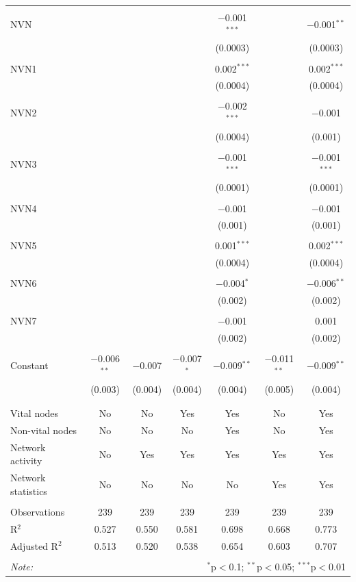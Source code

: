 \begin{table}[!htbp]
\begin{tabular}{@{\extracolsep{5pt}}lcccccc}
  & & & & & & \\ 
 NVN &  &  &  & $-$0.001$^{***}$ &  & $-$0.001$^{**}$ \\ 
  &  &  &  & (0.0003) &  & (0.0003) \\ 
  & & & & & & \\ 
 NVN1 &  &  &  & 0.002$^{***}$ &  & 0.002$^{***}$ \\ 
  &  &  &  & (0.0004) &  & (0.0004) \\ 
  & & & & & & \\ 
 NVN2 &  &  &  & $-$0.002$^{***}$ &  & $-$0.001 \\ 
  &  &  &  & (0.0004) &  & (0.001) \\ 
  & & & & & & \\ 
 NVN3 &  &  &  & $-$0.001$^{***}$ &  & $-$0.001$^{***}$ \\ 
  &  &  &  & (0.0001) &  & (0.0001) \\ 
  & & & & & & \\ 
 NVN4 &  &  &  & $-$0.001 &  & $-$0.001 \\ 
  &  &  &  & (0.001) &  & (0.001) \\ 
  & & & & & & \\ 
 NVN5 &  &  &  & 0.001$^{***}$ &  & 0.002$^{***}$ \\ 
  &  &  &  & (0.0004) &  & (0.0004) \\ 
  & & & & & & \\ 
 NVN6 &  &  &  & $-$0.004$^{*}$ &  & $-$0.006$^{**}$ \\ 
  &  &  &  & (0.002) &  & (0.002) \\ 
  & & & & & & \\ 
 NVN7 &  &  &  & $-$0.001 &  & 0.001 \\ 
  &  &  &  & (0.002) &  & (0.002) \\ 
  & & & & & & \\ 
 Constant & $-$0.006$^{**}$ & $-$0.007 & $-$0.007$^{*}$ & $-$0.009$^{**}$ & $-$0.011$^{**}$ & $-$0.009$^{**}$ \\ 
  & (0.003) & (0.004) & (0.004) & (0.004) & (0.005) & (0.004) \\ 
  & & & & & & \\ 
\hline \\[-1.8ex] 
Vital nodes & No & No & Yes & Yes & No & Yes \\ 
Non-vital nodes & No & No & No & Yes & No & Yes \\ 
Network activity & No & Yes & Yes & Yes & Yes & Yes \\ 
Network statistics & No & No & No & No & Yes & Yes \\ 
\hline &  &  &  &  &  &  \\ 
Observations & 239 & 239 & 239 & 239 & 239 & 239 \\ 
R$^{2}$ & 0.527 & 0.550 & 0.581 & 0.698 & 0.668 & 0.773 \\ 
Adjusted R$^{2}$ & 0.513 & 0.520 & 0.538 & 0.654 & 0.603 & 0.707 \\ 
\hline 
\hline \\[-1.8ex] 
\textit{Note:}  & \multicolumn{6}{r}{$^{*}$p$<$0.1; $^{**}$p$<$0.05; $^{***}$p$<$0.01} \\ 
\end{tabular} 
\end{table} 

